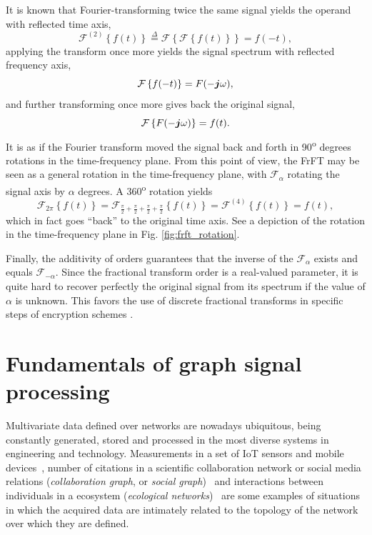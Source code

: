 It is known that Fourier-transforming twice the same signal yields the operand with reflected time axis,
\begin{equation}
\mathcal{F}^{(2)} \left\{ f(t) \right\} \overset{\Delta}{=}
\mathcal{F} \left\{ \mathcal{F} \left\{ f(t) \right\} \right\}
= f(-t),
\end{equation}
applying the transform once more yields the signal spectrum with reflected frequency axis,
\begin{equation}
\mathcal{F} \left\{ f(-t) \right\} = F(-\boldsymbol{j} \omega),
\end{equation}
and further transforming once more gives back the original signal,
\begin{equation}
\mathcal{F} \left\{ F(-\boldsymbol{j} \omega) \right\} = f(t).
\end{equation}
It is as if the Fourier transform moved the signal back and forth in 90\textsuperscript{o} degrees rotations in the time-frequency plane. From this point of view, the FrFT may be seen as a general rotation in the time-frequency plane, with $\mathcal{F}_\alpha$ rotating the signal axis by $\alpha$ degrees. A 360\textsuperscript{o} rotation yields
\begin{equation}
\mathcal{F}_{2\pi} \left\{ f(t) \right\} = \mathcal{F}_{
\frac{\pi}{2} + 
\frac{\pi}{2} + 
\frac{\pi}{2} + 
\frac{\pi}{2}
} \left\{ f(t) \right\} =
\mathcal{F}^{(4)} \left\{ f(t) \right\} = f(t),
\end{equation}
which in fact goes ``back'' to the original time axis. See a depiction of the rotation in the time-frequency plane in Fig. \ref{fig:frft_rotation}.

Finally, the additivity of orders guarantees that the inverse of the $\mathcal{F}_\alpha$ exists and equals $\mathcal{F}_{-\alpha}$. Since the fractional transform order is a real-valued parameter, it is quite hard to recover perfectly the original signal from its spectrum if the value of $\alpha$ is unknown. This favors the use of discrete fractional transforms in specific steps of encryption schemes \cite{tao2010image, kang2018reality, kang2018color}.

\section{Fundamentals of graph signal processing}

Multivariate data defined over networks are nowadays ubiquitous, being constantly generated, stored and processed in the most diverse systems in engineering and technology. Measurements in a set of IoT sensors and mobile devices~\cite{alam2015toward,guo2016qos,ma2016non,yu2016novel}, number of citations in a scientific collaboration network or social media relations (\emph{collaboration graph}, or \emph{social graph})~\cite{chung2010graph} and interactions between individuals in a ecosystem (\emph{ecological networks})~\cite{golubski2016} are some examples of situations in which the acquired data are intimately related to the topology of the network over which they are defined.

